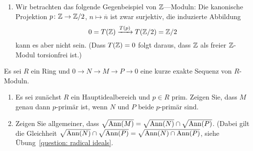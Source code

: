 \begin{solution}
\begin{enumerate}
    \item
      Wir betrachten das folgende Gegenbeispiel von $\mathbb{Z}$—Moduln:
      Die kanonische Projektion $p \colon \mathbb{Z} \to \mathbb{Z}/2$, $n \mapsto \overline{n}$ ist zwar surjektiv, die induzierte Abbildung
      \[
                                  0
        =                         T(\mathbb{Z})
        \xrightarrow{T(p)} T(\mathbb{Z}/2)
        =                         \mathbb{Z}/2
      \]
      kann es aber nicht sein. (Dass $T(\mathbb{Z}) = 0$ folgt daraus, dass $\mathbb{Z}$ als freier $\mathbb{Z}$-Modul torsionfrei ist.)
  \end{enumerate}
\end{solution}


\begin{question}[subtitle = $p$-primär in kurzen exakten Sequenzen]
  Es sei $R$ ein Ring und $0 \to N \to M \to P \to 0$ eine kurze exakte Sequenz von $R$-Moduln.
  \begin{enumerate}
    \item
      Es sei zunächst $R$ ein Hauptidealbereich und $p \in R$ prim.
      Zeigen Sie, dass $M$ genau dann $p$-primär ist, wenn $N$ und $P$ beide $p$-primär sind.
    \item
      Zeigen Sie allgemeiner, dass $\sqrt{\operatorname{Ann}(M)} = \sqrt{\operatorname{Ann}(N)} \cap \sqrt{\operatorname{Ann}(P)}$.
      (Dabei gilt die Gleichheit $\sqrt{\operatorname{Ann}(N)} \cap \sqrt{\operatorname{Ann}(P)} = \sqrt{\operatorname{Ann}(N) \cap \operatorname{Ann}(P)}$, siehe Übung~\ref{question: radical ideals}.
  \end{enumerate}
\end{question}


